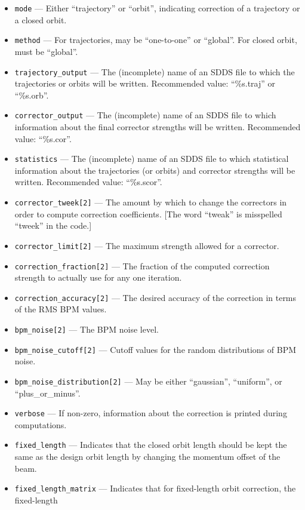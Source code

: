 \documentclass[11pt]{article}
\begin{document}
\begin{itemize}

\item \verb|mode| --- Either ``trajectory'' or ``orbit'', indicating
correction of a trajectory or a closed orbit.
\item \verb|method| --- For trajectories, may be ``one-to-one'' or
``global''.  For closed orbit, must be ``global''.
\item \verb|trajectory_output| --- The (incomplete) name of an SDDS file to which the trajectories or orbits will be written.  Recommended value: ``\%s.traj'' or ``\%s.orb''.  
\item \verb|corrector_output| --- The (incomplete) name of an SDDS file to which information about the final corrector strengths will be written. Recommended value: ``\%s.cor''.  
\item \verb|statistics| --- The (incomplete) name of an SDDS file to which statistical information about the
trajectories (or orbits) and corrector strengths will be written.  Recommended value: ``\%s.scor''.
\item \verb|corrector_tweek[2]| --- The amount by which to change the correctors in order to compute correction coefficients.
[The word ``tweak'' is misspelled ``tweek'' in the code.]
\item \verb|corrector_limit[2]| --- The maximum strength allowed for a corrector.
\item \verb|correction_fraction[2]| --- The fraction of the computed correction strength to actually use for any one iteration.
\item \verb|correction_accuracy[2]| --- The desired accuracy of the correction in terms of the RMS BPM values.
\item \verb|bpm_noise[2]| --- The BPM noise level. 
\item \verb|bpm_noise_cutoff[2]| --- Cutoff values for the random distributions of BPM noise.
\item \verb|bpm_noise_distribution[2]| --- May be either ``gaussian'', ``uniform'', or ``plus\_or\_minus''.
\item \verb|verbose| --- If non-zero, information about the correction is printed during computations.
\item \verb|fixed_length| --- Indicates that the closed orbit length should be kept the same as the design orbit
length by changing the momentum offset of the beam.
\item \verb|fixed_length_matrix| --- Indicates that for fixed-length orbit correction, the fixed-length

\end{itemize}
\end{document}
